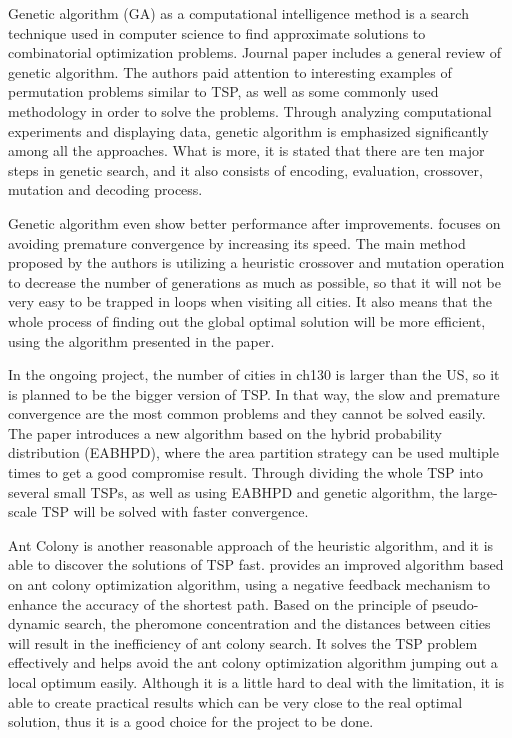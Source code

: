 \documentclass{article}
\begin{document}
Genetic algorithm (GA) as a computational intelligence method is a search technique used in computer science to find approximate solutions to combinatorial optimization problems. Journal paper\citep{Kartik2014Rai} includes a general review of genetic algorithm. The authors paid attention to interesting examples of permutation problems similar to TSP, as well as some commonly used methodology in order to solve the problems. Through analyzing computational experiments and displaying data, genetic algorithm is emphasized significantly among all the approaches. What is more, it is stated that there are ten major steps in genetic search, and it also consists of encoding, evaluation, crossover, mutation and decoding process.

Genetic algorithm even show better performance after improvements. \citep{VahdatiG2009ANAt}focuses on avoiding premature convergence by increasing its speed. The main method proposed by the authors is utilizing a heuristic crossover and mutation operation to decrease the number of generations as much as possible, so that it will not be very easy to be trapped in loops when visiting all cities. It also means that the whole process of finding out the global optimal solution will be more efficient, using the algorithm presented in the paper. 

In the ongoing project, the number of cities in ch130 is larger than the US, so it is planned to be the bigger version of TSP. In that way, the slow and premature convergence are the most common problems and they cannot be solved easily. The paper\cite{ChenJie2011UGAB} introduces a new algorithm based on the hybrid probability distribution (EABHPD), where the area partition strategy can be used multiple times to get a good compromise result. Through dividing the whole TSP into several small TSPs, as well as using EABHPD and genetic algorithm, the large-scale TSP will be solved with faster convergence.

Ant Colony is another reasonable approach of the heuristic algorithm, and it is able to discover the solutions of TSP fast. \citep{LiJ.2018APSA}provides an improved algorithm based on ant colony optimization algorithm, using a negative feedback mechanism to enhance the accuracy of the shortest path. Based on the principle of pseudo-dynamic search, the pheromone concentration and the distances between cities will result in the inefficiency of ant colony search. It solves the TSP problem effectively and helps avoid the ant colony optimization algorithm jumping out a local optimum easily. Although it is a little hard to deal with the limitation, it is able to create practical results which can be very close to the real optimal solution, thus it is a good choice for the project to be done.
\end{document}
